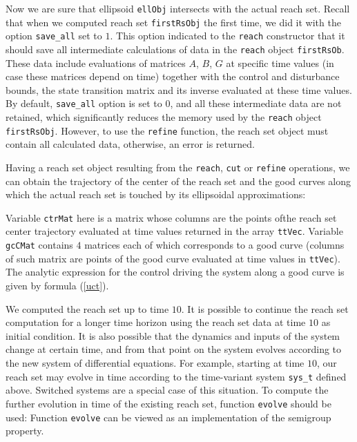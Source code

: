 Now we are sure that ellipsoid {\tt ellObj} intersects with the actual reach set.
Recall that when we computed reach set {\tt firstRsObj} the first time, we did it
with the option {\tt save\_all} set to $1$. This option indicated to the
{\tt reach} constructor that it should save all intermediate calculations of
data in the {\tt reach} object {\tt firstRsOb}. These data include evaluations
of matrices $A$, $B$, $G$ at specific time values (in case these
matrices depend on time) together with the control and disturbance
bounds, the state transition matrix and its inverse evaluated at
these time values.
By default, {\tt save\_all} option is set to $0$, and all these intermediate
data are not retained, which significantly reduces the memory used
by the {\tt reach} object {\tt firstRsObj}. However, to use the {\tt refine} function,
the reach set object must contain all calculated data, otherwise, an
error is returned.

Having a reach set object resulting from the {\tt reach}, {\tt cut} or
{\tt refine} operations, we can obtain the trajectory of the center
of the reach set and the good curves along which the actual reach set
is touched by its ellipsoidal approximations:

Variable {\tt ctrMat} here is a matrix whose columns are the points ofthe
reach set center trajectory evaluated at time values returned in the
array {\tt ttVec}. Variable {\tt gcCMat} contains $4$ matrices each of which
corresponds to a good curve (columns of such matrix are points of the
good curve evaluated at time values in {\tt ttVec}).
The analytic expression for the control driving the system along a good
curve is given by formula (\ref{uct}).

We computed the reach set up to time $10$. It is possible to continue
the reach set computation for a longer time horizon using the reach set
data at time $10$ as initial condition.
It is also possible that the dynamics and inputs of the system change at
certain time, and from that point on the system evolves according to the new
system of differential equations. For example, starting at time $10$, our
reach set may evolve in time according to the time-variant system {\tt sys\_t}
defined above. Switched systems are a special case of this situation.
To compute the further evolution in time of the existing reach set,
function {\tt evolve} should be used:
Function {\tt evolve} can be viewed as an implementation of the semigroup
property.

